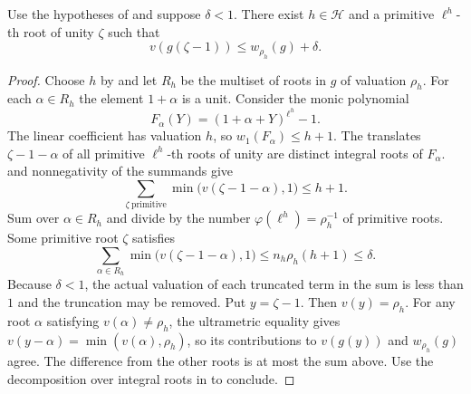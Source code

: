 \begin{lemma}
\label{lem:c-root-one-variable}
\emitthmsource
Use the hypotheses of  and suppose $\delta<1$.
There exist $h\in\mathcal H$ and a primitive $\ell^h$-th root of unity $\zeta$ such that
\[
 v(g(\zeta-1))\le w_{\rho_h}(g)+\delta.
\]
\end{lemma}
\begin{proof}
Choose $h$ by  and let $R_h$ be the multiset of roots in $g$ of valuation $\rho_h$. For each $\alpha\in R_h$ the element $1+\alpha$ is a unit. Consider the monic polynomial
\[
 F_\alpha(Y)=(1+\alpha+Y)^{\ell^h}-1 .
\]
The linear coefficient has valuation $h$, so $w_1(F_\alpha)\le h+1$.
The translates $\zeta-1-\alpha$ of all primitive $\ell^h$-th roots of unity are distinct integral roots of $F_\alpha$.
 and nonnegativity of the summands give
\[
 \sum_{\zeta\ \text{primitive}}\min\bigl(v(\zeta-1-\alpha),1\bigr)\le h+1.
\]
Sum over $\alpha\in R_h$ and divide by the number $\varphi(\ell^h)=\rho_h^{-1}$ of primitive roots. Some primitive root $\zeta$ satisfies
\[
 \sum_{\alpha\in R_h}\min\bigl(v(\zeta-1-\alpha),1\bigr)
 \le n_h\rho_h(h+1)\le\delta.
\]
Because $\delta<1$, the actual valuation of each truncated term in the sum is less than $1$ and the truncation may be removed.
Put $y=\zeta-1$. Then $v(y)=\rho_h$.
For any root $\alpha$ satisfying $v(\alpha)\ne\rho_h$, the ultrametric equality gives $v(y-\alpha)=\min(v(\alpha),\rho_h)$, so its contributions to $v(g(y))$ and $w_{\rho_h}(g)$ agree. The difference from the other roots is at most the sum above. Use the decomposition over integral roots in  to conclude.
\end{proof}

